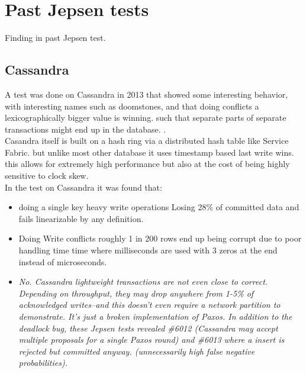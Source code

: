 \documentclass[a4paper,10pt,titlepage]{report}
\begin{document}




    
    
    
    

    \section{Past Jepsen tests}
        Finding in past Jepsen test.
    \subsection{Cassandra}
    A test was done on Cassandra in 2013 that showed some interesting behavior, with interesting names such as doomstones, and that doing conflicts a lexicographically bigger value is winning. such that separate parts of separate transactions might end up in the database. .\\
    \vspace{5mm}
    Casandra itself is built on a hash ring via a distributed hash table like Service Fabric. but unlike most other database it uses timestamp based last write wins. this allows for extremely high performance but also at the cost of being highly sensitive to clock skew.\\
    
    In the test on Cassandra it was found that:
    \begin{itemize}
        \item doing a single key heavy write operations Losing 28\% of committed data and fails linearizable by any definition.
        \item Doing Write conflicts roughly 1 in 200 rows end up being corrupt due to poor handling time time where milliseconds are used with 3 zeros at the end instead of microseconds.
        \item \textit{No. Cassandra lightweight transactions are not even close to correct. Depending on throughput, they may drop anywhere from 1-5\% of acknowledged writes–and this doesn’t even require a network partition to demonstrate. It’s just a broken implementation of Paxos. In addition to the deadlock bug, these Jepsen tests revealed \#6012 (Cassandra may accept multiple proposals for a single Paxos round) and \#6013 where a insert is rejected but committed anyway. (unnecessarily high false negative probabilities).}
    \end{itemize}
\end{document}
